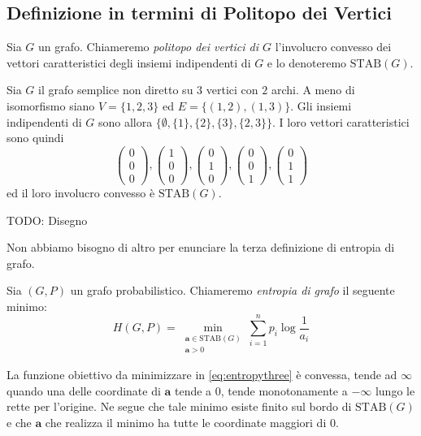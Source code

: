 \subsection{Definizione in termini di Politopo dei Vertici} 
\begin{definition}
	Sia \(G\) un grafo. Chiameremo \emph{politopo dei vertici di \(G\)} l'involucro convesso dei vettori caratteristici degli insiemi indipendenti di \(G\) e lo denoteremo \(\text{STAB}(G)\). 
\end{definition}
\begin{example}
	Sia \(G\) il grafo semplice non diretto su \(3\) vertici con \(2\) archi. A meno di isomorfismo siano \(V=\{1,2,3\}\) ed \(E=\{(1,2),(1,3)\}\). Gli insiemi indipendenti di \(G\) sono allora \(\{\emptyset , \{1\}, \{2\}, \{3\}, \{2,3\}\}\). I loro vettori caratteristici sono quindi
	\[ 
	\begin{pmatrix}
		0\\0\\0 
	\end{pmatrix}
	, 
	\begin{pmatrix}
		1\\0\\0 
	\end{pmatrix}
	, 
	\begin{pmatrix}
		0\\1\\0 
	\end{pmatrix}
	, 
	\begin{pmatrix}
		0\\0\\1 
	\end{pmatrix}
	, 
	\begin{pmatrix}
		0\\1\\1 
	\end{pmatrix}
	\]
	ed il loro involucro convesso è \(\text{STAB}(G)\).
	
	TODO: Disegno 
\end{example}

Non abbiamo bisogno di altro per enunciare la terza definizione di entropia di grafo. 
\begin{definition}
	Sia \((G,P)\) un grafo probabilistico. Chiameremo \emph{entropia di grafo} il seguente minimo: 
	\begin{equation}
		\label{eq:entropythree} H(G,P)=\min_{\substack{\mathbf{a}\in \text{STAB}(G) \\
		\mathbf{a} > 0}} \sum_{i=1}^n p_i \log{\frac{1}{a_i}} 
	\end{equation}
\end{definition}
\begin{remark}
	La funzione obiettivo da minimizzare in \eqref{eq:entropythree} è convessa, tende ad \(\infty\) quando una delle coordinate di \(\mathbf{a}\) tende a \(0\), tende monotonamente a \(-\infty\) lungo le rette per l'origine. Ne segue che tale minimo esiste finito sul bordo di \(\text{STAB}(G)\) e che \(\mathbf{a}\) che realizza il minimo ha tutte le coordinate maggiori di \(0\). 
\end{remark}

